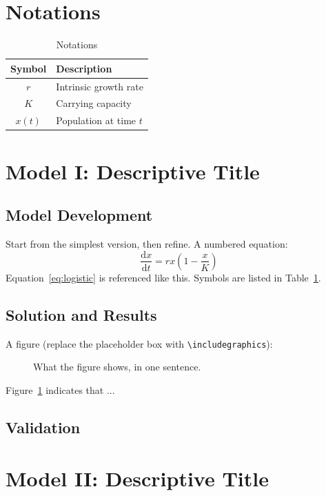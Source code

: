 \documentclass[12pt]{article}
\begin{document}
\section{Notations}
\begin{table}[H]
    \centering
    \caption{Notations}\label{tab:notation}
    \begin{tabular}{cl}
        \toprule
        Symbol & Description \\
        \midrule
        $r$ & Intrinsic growth rate \\
        $K$ & Carrying capacity \\
        $x(t)$ & Population at time $t$ \\
        \bottomrule
    \end{tabular}
\end{table}

\section{Model I: Descriptive Title}
\subsection{Model Development}
Start from the simplest version, then refine. A numbered equation:
\begin{equation}\label{eq:logistic}
    \frac{\mathrm{d}x}{\mathrm{d}t} = r x \left(1 - \frac{x}{K}\right)
\end{equation}
Equation~\eqref{eq:logistic} is referenced like this. Symbols are listed in Table~\ref{tab:notation}.

\subsection{Solution and Results}
A figure (replace the placeholder box with \verb|\includegraphics|):
\begin{figure}[H]
    \centering
    \fbox{\rule{0pt}{4cm}\rule{0.6\textwidth}{0pt}}
    \caption{What the figure shows, in one sentence.}\label{fig:demo}
\end{figure}
Figure~\ref{fig:demo} indicates that ...

\subsection{Validation}

\section{Model II: Descriptive Title}
\end{document}
